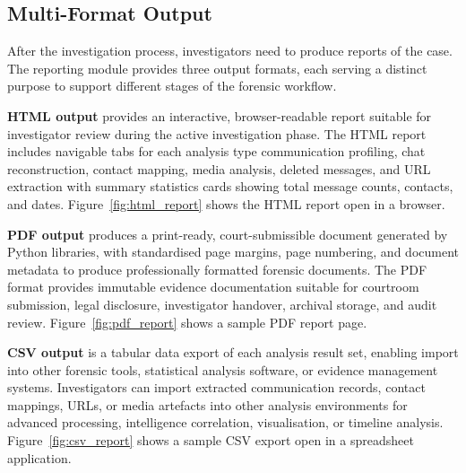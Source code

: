 \documentclass[12pt,a4paper]{report}
\begin{document}
\subsection{Multi-Format Output}

After the investigation process, investigators need to produce reports of the case. The reporting module provides three output formats, each serving a distinct purpose to support different stages of the forensic workflow.

\textbf{HTML output} provides an interactive, browser-readable report suitable for investigator review during the active investigation phase. The HTML report includes navigable tabs for each analysis type communication profiling, chat reconstruction, contact mapping, media analysis, deleted messages, and URL extraction with summary statistics cards showing total message counts, contacts, and dates. Figure~\ref{fig:html_report} shows the HTML report open in a browser.


\textbf{PDF output} produces a print-ready, court-submissible document generated by Python libraries, with standardised page margins, page numbering, and document metadata to produce professionally formatted forensic documents. The PDF format provides immutable evidence documentation suitable for courtroom submission, legal disclosure, investigator handover, archival storage, and audit review. Figure~\ref{fig:pdf_report} shows a sample PDF report page.


\textbf{CSV output} is a tabular data export of each analysis result set, enabling import into other forensic tools, statistical analysis software, or evidence management systems. Investigators can import extracted communication records, contact mappings, URLs, or media artefacts into other analysis environments for advanced processing, intelligence correlation, visualisation, or timeline analysis. Figure~\ref{fig:csv_report} shows a sample CSV export open in a spreadsheet application.
\end{document}
